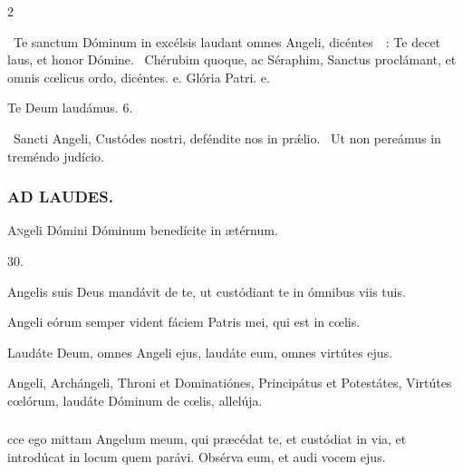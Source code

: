 \documentclass[9pt,twoside]{extarticle}
\begin{document}
\begin{multicols}{2}
{{\begin{tightlist}{}
\item {}~Te sanctum Dóminum in excélsis laudant omnes Angeli, dicéntes~~: \textred{*} Te decet laus, et honor Dómine. ~Chérubim quoque, ac Séraphim, Sanctus proclámant, et omnis cœlicus ordo, dicéntes. e. Glória Patri. e.
\item Te Deum laudámus. 6.
\item {}~Sancti Angeli, Custódes nostri, deféndite nos in prǽlio. ~Ut non pereámus in treméndo judício.
\end{tightlist}

\subsubsection*{\center \textsc{AD LAUDES.}}
\begin{center}\end{center}
\lettrine{A}ngeli Dómini Dóminum benedícite in ætérnum.

\begin{tightlist}{}
\item {} 30.
\item {} Angelis suis Deus mandávit de te, ut custódiant te in ómnibus viis tuis.
\item {} Angeli eórum semper vident fáciem Patris mei, qui est in cœlis.
\item {} Laudáte Deum, omnes Angeli ejus, laudáte eum, omnes virtútes ejus.
\item {} Angeli, Archángeli, Throni et Dominatiónes, Principátus et Potestátes, Virtútes cœlórum, laudáte Dóminum de cœlis, allelúja.
\end{tightlist}

\subsubsection*{}
cce ego mittam Angelum meum, qui præcédat te, et custódiat in via, et introdúcat in locum quem parávi. Obsérva eum, et audi vocem ejus.

}}
\end{multicols}
\end{document}
